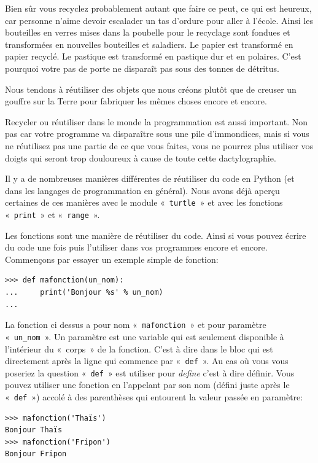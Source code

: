 Bien sûr vous recyclez probablement autant que faire ce peut, ce qui est heureux, car personne n'aime devoir escalader un tas d'ordure pour aller à l'école. Ainsi les bouteilles en verres mises dans la poubelle pour le recyclage sont fondues et transformées en nouvelles bouteilles et saladiers. Le papier est transformé en papier recyclé. Le pastique est transformé en pastique dur et en polaires. C'est pourquoi votre pas de porte ne disparaît pas sous des tonnes de détritus.

Nous tendons à réutiliser des objets que nous créons plutôt que de creuser un gouffre sur la Terre pour fabriquer les mêmes choses encore et encore.

Recycler ou réutiliser dans le monde la programmation est aussi important. Non pas car votre programme va disparaître sous une pile d'immondices, mais si vous ne réutilisez pas une partie de ce que vous faites, vous ne pourrez plus utiliser vos doigts qui seront trop douloureux à cause de toute cette dactylographie.

Il y a de nombreuses manières différentes de réutiliser du code en Python (et dans les langages de programmation en général). Nous avons déjà aperçu certaines de ces manières avec le module «~\texttt{turtle}~»  et avec les fonctions «~\texttt{print}~» et «~\texttt{range}~».

Les fonctions sont une manière de réutiliser du code. Ainsi si vous pouvez écrire du code une fois puis l'utiliser dans vos programmes encore et encore. Commençons par essayer un exemple simple de fonction:

\begin{Verbatim}[frame=single,rulecolor=\color{mbleu}, label=à taper]
>>> def mafonction(un_nom):
...     print('Bonjour %s' % un_nom)
...
\end{Verbatim}

La fonction ci dessus a pour nom «~\texttt{mafonction}~» et pour paramètre «~\texttt{un\_nom}~».
Un paramètre est une variable qui est seulement disponible à l'intérieur du «~corps~» de la fonction. 
C'est à dire dans le bloc qui est directement après la ligne qui commence par «~\texttt{def}~». Au cas où vous vous poseriez la question «~\texttt{def}~»  est utiliser pour \emph{define} c'est à dire définir. Vous pouvez utiliser une fonction en l'appelant par son nom (défini juste après le «~\texttt{def}~») accolé à des parenthèses  qui entourent la valeur passée en paramètre:

\begin{Verbatim}[frame=single,rulecolor=\color{mbleu}, label=à taper]
>>> mafonction('Thaïs')
Bonjour Thaïs
>>> mafonction('Fripon')
Bonjour Fripon
\end{Verbatim}


